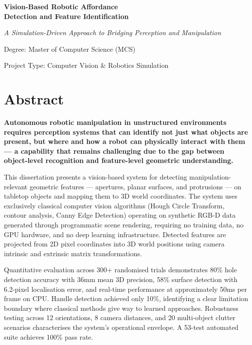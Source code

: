 \documentclass[11pt,a4paper]{article}
\begin{document}
\begin{titlepage}
\centering
\vspace*{4cm}
{\Huge\bfseries\color{darkblue} Vision-Based Robotic Affordance\\[6pt]Detection and Feature Identification\par}
\vspace{1.2cm}
{\Large\itshape\color{medblue} A Simulation-Driven Approach to Bridging Perception and Manipulation\par}
\vspace{3cm}
{\large Degree: Master of Computer Science (MCS)\par}
\vspace{0.3cm}
{\large Project Type: Computer Vision \& Robotics Simulation\par}
\vfill
\end{titlepage}

\tableofcontents
\newpage

\section*{Abstract}

\textbf{Autonomous robotic manipulation in unstructured environments requires perception systems that can identify not just what objects are present, but where and how a robot can physically interact with them --- a capability that remains challenging due to the gap between object-level recognition and feature-level geometric understanding.}

This dissertation presents a vision-based system for detecting manipulation-relevant geometric features --- apertures, planar surfaces, and protrusions --- on tabletop objects and mapping them to 3D world coordinates. The system uses exclusively classical computer vision algorithms (Hough Circle Transform, contour analysis, Canny Edge Detection) operating on synthetic RGB-D data generated through programmatic scene rendering, requiring no training data, no GPU hardware, and no deep learning infrastructure. Detected features are projected from 2D pixel coordinates into 3D world positions using camera intrinsic and extrinsic matrix transformations.

Quantitative evaluation across 300+ randomised trials demonstrates 80\% hole detection accuracy with 36mm mean 3D precision, 58\% surface detection with 6.2-pixel localisation error, and real-time performance at approximately 50ms per frame on CPU. Handle detection achieved only 10\%, identifying a clear limitation boundary where classical methods give way to learned approaches. Robustness testing across 12 orientations, 8 camera distances, and 20 multi-object clutter scenarios characterises the system's operational envelope. A 53-test automated suite achieves 100\% pass rate.
\end{document}
